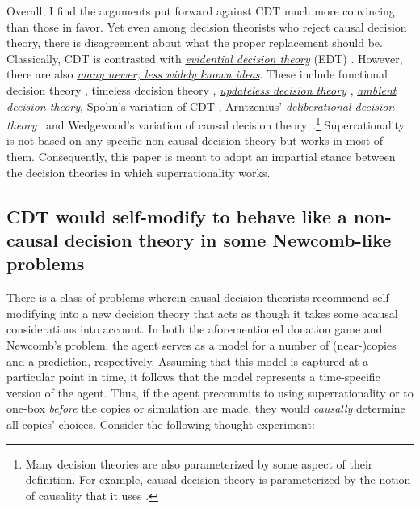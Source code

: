 Overall, I find the arguments put forward against CDT much more
convincing than those in favor. Yet even among decision theorists who
reject causal decision theory, there is disagreement about what the
proper replacement should be. Classically, CDT is contrasted with
\href{https://en.wikipedia.org/wiki/Evidential_decision_theory}{\emph{evidential
decision theory}} (EDT)
\parencite{Ahmed2014-ec,Almond2010-xn,Price1986-qs,Horgan1981-hb}.
However, there are also
\href{https://casparoesterheld.com/a-comprehensive-list-of-decision-theories/}{\emph{many
newer, less widely known ideas}}. These include functional decision
theory \parencite{Soares_undated-aj}, timeless decision
theory \parencite{Yudkowsky2010-ul},
\href{https://wiki.lesswrong.com/wiki/Updateless_decision_theory}{\emph{updateless
decision theory}}
\parencite{Benson-Tilsen2014-cv,Hintze2014-xs,McAllister_undated-ms},
\href{https://wiki.lesswrong.com/wiki/Ambient_decision_theory}{\emph{ambient
decision theory}}, Spohn's variation of CDT
\parencite{Spohn2003-zf,Spohn2005-tm,Spohn2012-fo},
Arntzenius' \emph{deliberational decision theory}~\parencite{Arntzenius2008-wh} and
Wedgewood's variation of causal decision theory~\parencite{Wedgwood2013-mt}.\footnote{Many decision
  theories are also parameterized by some aspect of their definition.
  For example, causal decision theory is parameterized by the notion of
  causality that it uses
  \parencite{Lewis1981-ct,Hajek2006-me,Weirich2016-gq,Pearl2009-xn}.}
Superrationality is not based on any specific non-causal decision theory
but works in most of them. Consequently, this paper is meant to adopt an
impartial stance between the decision theories in which superrationality
works.

\hypertarget{cdt-would-self-modify-to-behave-like-a-non-causal-decision-theory-in-some-newcomb-like-problems}{\subsection{CDT
would self-modify to behave like a non-causal decision theory in some
Newcomb-like problems
}\label{cdt-would-self-modify-to-behave-like-a-non-causal-decision-theory-in-some-newcomb-like-problems}}

There is a class of problems wherein causal decision theorists
recommend self-modifying into a new decision theory that acts as though
it takes some acausal considerations into account. In both the
aforementioned donation game and Newcomb's problem, the agent serves as
a model for a number of (near-)copies and a prediction, respectively.
Assuming that this model is captured at a particular point in time, it
follows that the model represents a time-specific version of the agent.
Thus, if the agent precommits to using superrationality or to one-box
\emph{before} the copies or simulation are made, they would
\emph{causally} determine all copies' choices. Consider the following
thought experiment:

